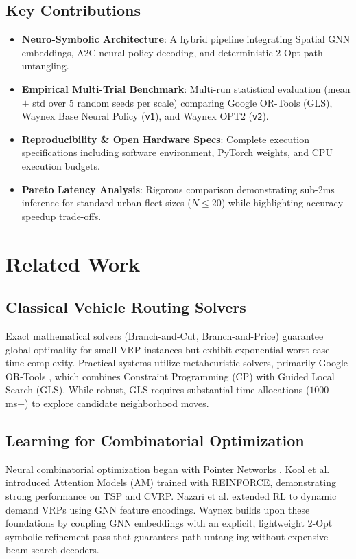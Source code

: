 \documentclass[10pt,journal,compsoc]{IEEEtran}
\begin{document}
\subsection{Key Contributions}
\begin{itemize}
    \item \textbf{Neuro-Symbolic Architecture}: A hybrid pipeline integrating Spatial GNN embeddings, A2C neural policy decoding, and deterministic 2-Opt path untangling.
    \item \textbf{Empirical Multi-Trial Benchmark}: Multi-run statistical evaluation (mean $\pm$ std over 5 random seeds per scale) comparing Google OR-Tools (GLS), Waynex Base Neural Policy (\texttt{v1}), and Waynex OPT2 (\texttt{v2}).
    \item \textbf{Reproducibility & Open Hardware Specs}: Complete execution specifications including software environment, PyTorch weights, and CPU execution budgets.
    \item \textbf{Pareto Latency Analysis}: Rigorous comparison demonstrating sub-2ms inference for standard urban fleet sizes ($N \le 20$) while highlighting accuracy-speedup trade-offs.
\end{itemize}

\section{Related Work}

\subsection{Classical Vehicle Routing Solvers}
Exact mathematical solvers (Branch-and-Cut, Branch-and-Price) guarantee global optimality for small VRP instances but exhibit exponential worst-case time complexity. Practical systems utilize metaheuristic solvers, primarily Google OR-Tools \cite{ortools}, which combines Constraint Programming (CP) with Guided Local Search (GLS). While robust, GLS requires substantial time allocations ($1000$\,ms+) to explore candidate neighborhood moves.

\subsection{Learning for Combinatorial Optimization}
Neural combinatorial optimization began with Pointer Networks \cite{vinyals2015}. Kool et al. \cite{kool2018} introduced Attention Models (AM) trained with REINFORCE, demonstrating strong performance on TSP and CVRP. Nazari et al. \cite{nazari2018} extended RL to dynamic demand VRPs using GNN feature encodings. Waynex builds upon these foundations by coupling GNN embeddings with an explicit, lightweight 2-Opt symbolic refinement pass that guarantees path untangling without expensive beam search decoders.
\end{document}
